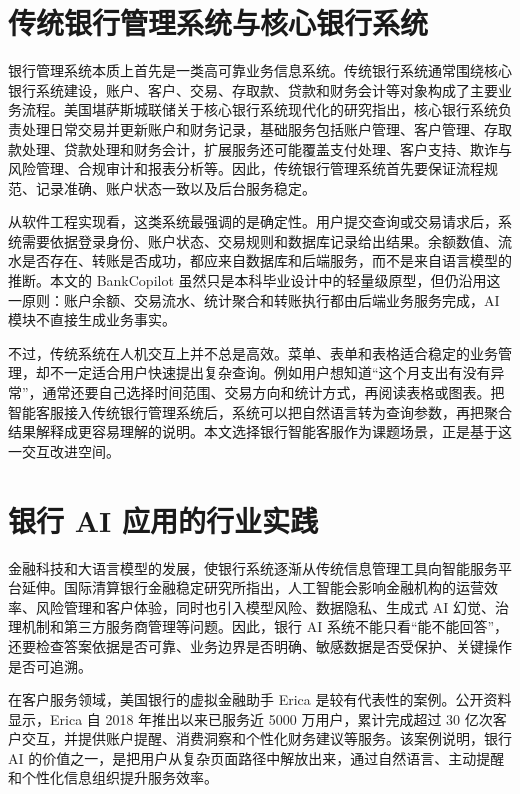 \documentclass[bachelor, print]{xduthesis}
\begin{document}
\section{传统银行管理系统与核心银行系统}

银行管理系统本质上首先是一类高可靠业务信息系统。传统银行系统通常围绕核心银行系统建设，账户、客户、交易、存取款、贷款和财务会计等对象构成了主要业务流程。美国堪萨斯城联储关于核心银行系统现代化的研究指出，核心银行系统负责处理日常交易并更新账户和财务记录，基础服务包括账户管理、客户管理、存取款处理、贷款处理和财务会计，扩展服务还可能覆盖支付处理、客户支持、欺诈与风险管理、合规审计和报表分析等\cite{kcfed2024corebanking}。因此，传统银行管理系统首先要保证流程规范、记录准确、账户状态一致以及后台服务稳定。

从软件工程实现看，这类系统最强调的是确定性。用户提交查询或交易请求后，系统需要依据登录身份、账户状态、交易规则和数据库记录给出结果。余额数值、流水是否存在、转账是否成功，都应来自数据库和后端服务，而不是来自语言模型的推断。本文的 BankCopilot 虽然只是本科毕业设计中的轻量级原型，但仍沿用这一原则：账户余额、交易流水、统计聚合和转账执行都由后端业务服务完成，AI 模块不直接生成业务事实。

不过，传统系统在人机交互上并不总是高效。菜单、表单和表格适合稳定的业务管理，却不一定适合用户快速提出复杂查询。例如用户想知道“这个月支出有没有异常”，通常还要自己选择时间范围、交易方向和统计方式，再阅读表格或图表。把智能客服接入传统银行管理系统后，系统可以把自然语言转为查询参数，再把聚合结果解释成更容易理解的说明。本文选择银行智能客服作为课题场景，正是基于这一交互改进空间。

\section{银行 AI 应用的行业实践}

金融科技和大语言模型的发展，使银行系统逐渐从传统信息管理工具向智能服务平台延伸。国际清算银行金融稳定研究所指出，人工智能会影响金融机构的运营效率、风险管理和客户体验，同时也引入模型风险、数据隐私、生成式 AI 幻觉、治理机制和第三方服务商管理等问题\cite{bis2024regulatingai}。因此，银行 AI 系统不能只看“能不能回答”，还要检查答案依据是否可靠、业务边界是否明确、敏感数据是否受保护、关键操作是否可追溯。

在客户服务领域，美国银行的虚拟金融助手 Erica 是较有代表性的案例。公开资料显示，Erica 自 2018 年推出以来已服务近 5000 万用户，累计完成超过 30 亿次客户交互，并提供账户提醒、消费洞察和个性化财务建议等服务\cite{bofa2025erica}。该案例说明，银行 AI 的价值之一，是把用户从复杂页面路径中解放出来，通过自然语言、主动提醒和个性化信息组织提升服务效率。
\end{document}
